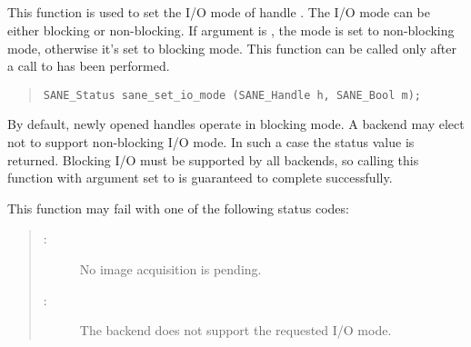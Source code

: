 \documentclass[11pt,DVIps]{report}
\begin{document}
\subsection{}

This function is used to set the I/O mode of handle .  The I/O mode
can be either blocking or non-blocking.  If argument  is
, the mode is set to non-blocking mode, otherwise it's set to
blocking mode.  This function can be called only after a call to
 has been performed.
\begin{quote}
\begin{verbatim}
SANE_Status sane_set_io_mode (SANE_Handle h, SANE_Bool m);
\end{verbatim}
\end{quote}
By default, newly opened handles operate in blocking mode.  A backend
may elect not to support non-blocking I/O mode.  In such a case the
status value  is returned.  Blocking
I/O must be supported by all backends, so calling this function with
argument  set to  is guaranteed to complete
successfully.

This function may fail with one of the following status codes:
\begin{quote}
\begin{description}
\item[:] No image acquisition is pending.
\item[:] The backend does not support
the requested I/O mode.
\end{description}
\end{quote}


\subsection{}
\end{document}
